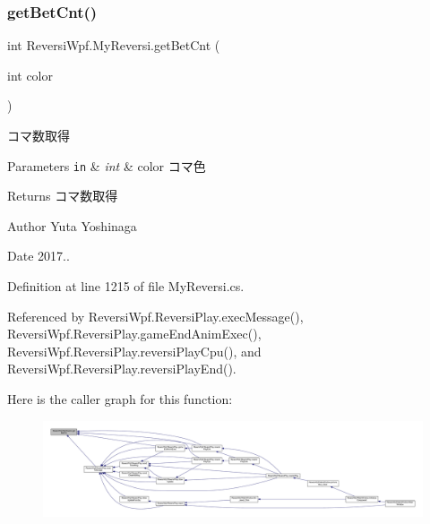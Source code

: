 \subsubsection{\texorpdfstring{get\+Bet\+Cnt()}{getBetCnt()}}
{\footnotesize\ttfamily int Reversi\+Wpf.\+My\+Reversi.\+get\+Bet\+Cnt (\begin{DoxyParamCaption}\item[{int}]{color }\end{DoxyParamCaption})}



コマ数取得 


\begin{DoxyParams}[1]{Parameters}
\mbox{\tt in}  & {\em int} & color コマ色 \\
\hline
\end{DoxyParams}
\begin{DoxyReturn}{Returns}
コマ数取得 
\end{DoxyReturn}
\begin{DoxyAuthor}{Author}
Yuta Yoshinaga 
\end{DoxyAuthor}
\begin{DoxyDate}{Date}
2017.. 
\end{DoxyDate}


Definition at line 1215 of file My\+Reversi.\+cs.



Referenced by Reversi\+Wpf.\+Reversi\+Play.\+exec\+Message(), Reversi\+Wpf.\+Reversi\+Play.\+game\+End\+Anim\+Exec(), Reversi\+Wpf.\+Reversi\+Play.\+reversi\+Play\+Cpu(), and Reversi\+Wpf.\+Reversi\+Play.\+reversi\+Play\+End().

Here is the caller graph for this function\+:
\nopagebreak
\begin{figure}[H]
\begin{center}
\leavevmode
\includegraphics[width=350pt]{class_reversi_wpf_1_1_my_reversi_a57482d7118dad2c5d104e186acd5212b_icgraph}
\end{center}
\end{figure}
\mbox{\label{class_reversi_wpf_1_1_my_reversi_a9a7c386e4b5007a937865ab301774c9e}} 
